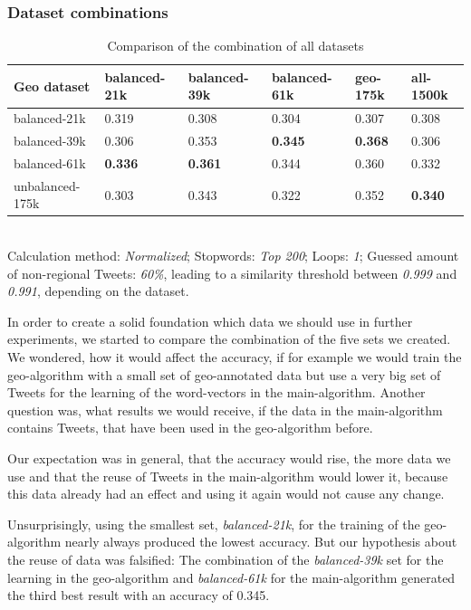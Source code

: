 \documentclass[../Main.tex]{subfiles}
\begin{document}
\subsubsection{Dataset combinations}
\label{dataset_section}
\begin{table}[b]
    \begin{tabular}{|l|lllll|}
    \hline
    Geo dataset     & balanced-21k & balanced-39k & balanced-61k & geo-175k & all-1500k \\ \hline
    balanced-21k    & 0.319        & 0.308        & 0.304        & 0.307           & 0.308       \\
    balanced-39k    & 0.306        & 0.353       & \textbf{0.345}        & \textbf{0.368 }          & 0.306       \\
    balanced-61k    & \textbf{0.336}        & \textbf{0.361}        & 0.344        &0.360           & 0.332       \\
    unbalanced-175k & 0.303        & 0.343        & 0.322        & 0.352           & \textbf{0.340}       \\ \hline
    \end{tabular} \\

  Calculation method: \textit{Normalized}; Stopwords: \textit{Top 200}; Loops: \textit{1}; Guessed amount of non-regional Tweets: \textit{60\%}, leading to a similarity threshold between \textit{0.999} and \textit{0.991}, depending on the dataset.
  \caption{Comparison of the combination of all datasets}
  \label{geo_datasets}
\end{table}

In order to create a solid foundation which data we should use in further experiments, we started to compare the combination of the five sets we created. We wondered, how it would affect the accuracy, if  for example we would train the geo-algorithm with a small set of geo-annotated data but use a very big set of Tweets for the learning of the word-vectors in the main-algorithm. Another question was, what results we would receive, if the data in the main-algorithm contains Tweets, that have been used in the geo-algorithm before. 

Our expectation was in general, that the accuracy would rise, the more data we use and that the reuse of Tweets in the main-algorithm would lower it, because this data already had an effect and using it again would not cause any change.

Unsurprisingly, using the smallest set, \emph{balanced-21k}, for the training of the geo-algorithm nearly always produced the lowest accuracy. 
But our hypothesis about the reuse of data was falsified:  The combination of the \emph{balanced-39k} set for the learning in the geo-algorithm and \emph{balanced-61k} for the main-algorithm generated the third best result with an accuracy of 0.345.
\end{document}
